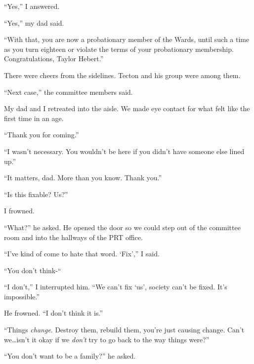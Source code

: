 ``Yes,'' I answered.



``Yes,'' my dad said.



``With that, you are now a probationary member of the Wards, until such a time as you turn eighteen or violate the terms of your probationary membership.  Congratulations, Taylor Hebert.''



There were cheers from the sidelines.  Tecton and his group were among them.



``Next case,'' the committee members said.



My dad and I retreated into the aisle.  We made eye contact for what felt like the first time in an age.



``Thank you for coming.''



``I wasn't necessary.  You wouldn't be here if you didn't have someone else lined up.''



``It matters, dad.  More than you know.  Thank you.''



``Is this fixable?  Us?''



I frowned.



``What?'' he asked.  He opened the door so we could step out of the committee room and into the hallways of the PRT office.



``I've kind of come to hate that word.  `Fix','' I said.



``You don't think-``



``I don't,'' I interrupted him.  ``We can't fix `us', society can't be fixed.  It's impossible.''



He frowned.  ``I don't think it is.''



``Things \emph{change}.  Destroy them, rebuild them, you're just causing change.  Can't we\ldots isn't it okay if we \emph{don't} try to go back to the way things were?''



``You don't want to be a family?'' he asked.




